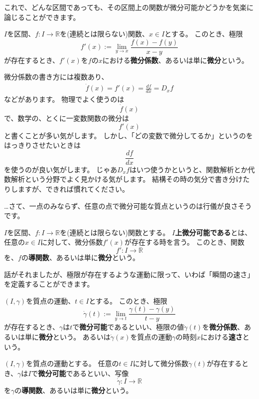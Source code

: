 これで、どんな区間であっても、その区間上の関数が微分可能かどうかを気楽に論じることができます。
\begin{definition}
  $I$を区間、$f:I\to\mathbb{R}$を(連続とは限らない)関数、$x\in I$とする。
  このとき、極限
  \[
    f'(x):=\lim_{y\to x}\frac{f(x)-f(y)}{x-y}
  \]
  が存在するとき、$f'(x)$を$f$の$x$における\textbf{微分係数}、あるいは単に\textbf{微分}という。
\end{definition}

微分係数の書き方には複数あり、
\begin{align*}
  \dot{f}(x)=f'(x)=\frac{df}{dx}=D_xf
\end{align*}
などがあります。
物理でよく使うのは
\[
  \dot{f}(x)
\]
で、数学の、とくに一変数関数の微分は
\[
  f'(x)
\]
と書くことが多い気がします。
しかし、「どの変数で微分してるか」というのをはっきりさせたいときは
\[
  \frac{df}{dx}
\]
を使うのが良い気がします。
じゃあ$D_xf$はいつ使うかというと、関数解析とか代数解析という分野でよく見かける気がします。
結構その時の気分で書き分けたりしますが、できれば慣れてください。

…さて、一点のみならず、任意の点で微分可能な質点というのは行儀が良さそうです。
\begin{definition}
  $I$を区間、$f:I\to\mathbb{R}$を(連続とは限らない)関数とする。
  \textbf{$I$上微分可能である}とは、任意の$x\in I$に対して、微分係数$f'(x)$が存在する時を言う。
  このとき、関数
  \[
    f':I\to\mathbb{R}
  \]
  を、$f$の\textbf{導関数}、あるいは単に\textbf{微分}という。
\end{definition}

話がそれましたが、極限が存在するような運動に限って、いわば「瞬間の速さ」を定義することができます。
\begin{definition}
  $(I,\gamma)$を質点の運動、$t\in I$とする。
  このとき、極限
  \[
    \dot\gamma(t):=\lim_{y\to t}\frac{\gamma(t)-\gamma(y)}{t-y}
  \]
  が存在するとき、$\gamma$は$t$で\textbf{微分可能}であるといい、極限の値$\dot\gamma(t)$を\textbf{微分係数}、あるいは単に\textbf{微分}という。
  あるいは$\dot\gamma(x)$を質点の運動$\gamma$の時刻$x$における\textbf{速さ}という。
\end{definition}

\begin{definition}
  $(I,\gamma)$を質点の運動とする。
  任意の$t\in I$に対して微分係数$\dot\gamma(t)$が存在するとき、$\gamma$は$I$で\textbf{微分可能}であるといい、写像
  \[
    \dot\gamma:I\to\mathbb{R}
  \]
  を$\gamma$の\textbf{導関数}、あるいは単に\textbf{微分}という。
\end{definition}



